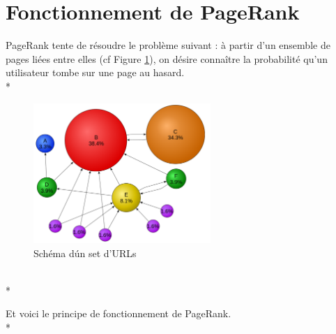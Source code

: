 \documentclass{article}
\begin{document}
\section{Fonctionnement de PageRank}

PageRank tente de r\'{e}soudre le probl\`{e}me  suivant : \`{a} partir d'un ensemble de pages li\'{e}es entre elles (cf Figure \ref{fig:pagerankscheme}), on d\'{e}sire conna\^{i}tre la probabilit\'{e} qu'un utilisateur tombe sur une page au hasard. \\*

\begin{figure}[h]
\begin{center}
\includegraphics[width=0.60\textwidth]{pagerankscheme}
\caption{Sch\'{e}ma d\'un set d'URLs}
\label{fig:pagerankscheme}
\end{center}
\end{figure}
~\\*

Et voici le principe de fonctionnement de PageRank. \\*
\end{document}
